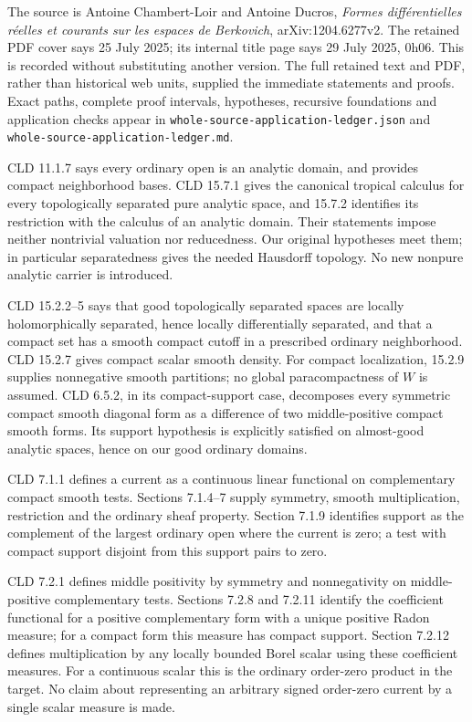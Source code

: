 \documentclass[11pt]{article}
\begin{document}
The source is Antoine Chambert-Loir and Antoine Ducros, \emph{Formes différentielles réelles et courants sur les espaces de Berkovich}, arXiv:1204.6277v2. The retained PDF cover says 25 July 2025; its internal title page says 29 July 2025, 0h06. This is recorded without substituting another version. The full retained text and PDF, rather than historical web units, supplied the immediate statements and proofs. Exact paths, complete proof intervals, hypotheses, recursive foundations and application checks appear in \texttt{whole-source-application-ledger.json} and \texttt{whole-source-application-ledger.md}.

CLD 11.1.7 says every ordinary open is an analytic domain, and provides compact neighborhood bases. CLD 15.7.1 gives the canonical tropical calculus for every topologically separated pure analytic space, and 15.7.2 identifies its restriction with the calculus of an analytic domain. Their statements impose neither nontrivial valuation nor reducedness. Our original hypotheses meet them; in particular separatedness gives the needed Hausdorff topology. No new nonpure analytic carrier is introduced.

CLD 15.2.2--5 says that good topologically separated spaces are locally holomorphically separated, hence locally differentially separated, and that a compact set has a smooth compact cutoff in a prescribed ordinary neighborhood. CLD 15.2.7 gives compact scalar smooth density. For compact localization, 15.2.9 supplies nonnegative smooth partitions; no global paracompactness of \(W\) is assumed. CLD 6.5.2, in its compact-support case, decomposes every symmetric compact smooth diagonal form as a difference of two middle-positive compact smooth forms. Its support hypothesis is explicitly satisfied on almost-good analytic spaces, hence on our good ordinary domains.

CLD 7.1.1 defines a current as a continuous linear functional on complementary compact smooth tests. Sections 7.1.4--7 supply symmetry, smooth multiplication, restriction and the ordinary sheaf property. Section 7.1.9 identifies support as the complement of the largest ordinary open where the current is zero; a test with compact support disjoint from this support pairs to zero.

CLD 7.2.1 defines middle positivity by symmetry and nonnegativity on middle-positive complementary tests. Sections 7.2.8 and 7.2.11 identify the coefficient functional for a positive complementary form with a unique positive Radon measure; for a compact form this measure has compact support. Section 7.2.12 defines multiplication by any locally bounded Borel scalar using these coefficient measures. For a continuous scalar this is the ordinary order-zero product in the target. No claim about representing an arbitrary signed order-zero current by a single scalar measure is made.
\end{document}
